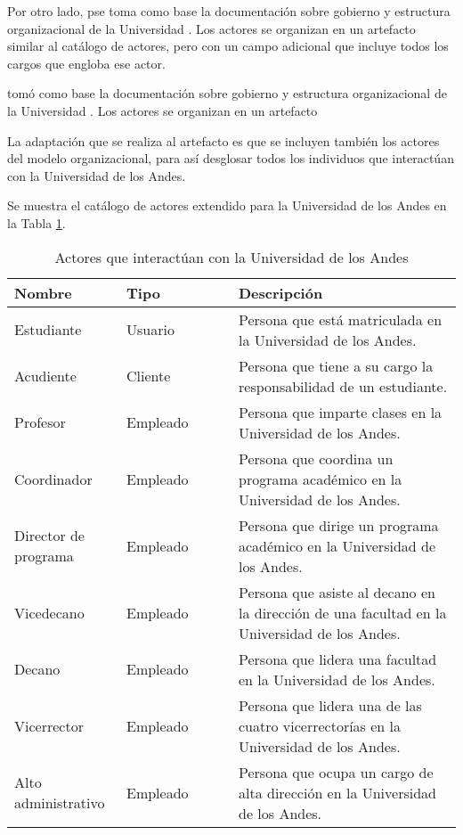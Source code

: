 Por otro lado, pse toma como base la documentación sobre gobierno y estructura organizacional de la Universidad \cite{gobieronEstructuraOrganizacional}. Los actores se organizan en un artefacto similar al catálogo de actores, pero con un campo adicional que incluye todos los cargos que engloba ese actor.


tomó como base la documentación sobre gobierno y estructura organizacional de la Universidad \cite{gobiernoEstructuraOrganizacional}. Los actores se organizan en un artefacto


La adaptación que se realiza al artefacto es que se incluyen también los actores del modelo organizacional, para así desglosar todos los individuos que interactúan con la Universidad de los Andes.

Se muestra el catálogo de actores extendido para la Universidad de los Andes en la Tabla \ref{tab:actores}.

\begin{table}[h]
	\caption{Actores que interactúan con la Universidad de los Andes}
	\centering
	\alternatecolors
	\begin{tabular}{|p{0.25\linewidth}|p{0.25\linewidth}|p{0.5\linewidth}|}
		\hline
		\textbf{Nombre}      & \textbf{Tipo} & \textbf{Descripción}                                                                         \\
		\hline
		Estudiante           & Usuario       & Persona que está matriculada en la Universidad de los Andes.                                 \\
		Acudiente            & Cliente       & Persona que tiene a su cargo la responsabilidad de un estudiante.                            \\ \hline
		Profesor             & Empleado      & Persona que imparte clases en la Universidad de los Andes.                                   \\ \hline
		Coordinador          & Empleado      & Persona que coordina un programa académico en la Universidad de los Andes.                   \\ \hline
		Director de programa & Empleado      & Persona que dirige un programa académico en la Universidad de los Andes.                     \\
		Vicedecano           & Empleado      & Persona que asiste al decano en la dirección de una facultad en la Universidad de los Andes. \\
		Decano               & Empleado      & Persona que lidera una facultad en la Universidad de los Andes.                              \\
		Vicerrector          & Empleado      & Persona que lidera una de las cuatro vicerrectorías en la Universidad de los Andes.          \\
		Alto administrativo  & Empleado      & Persona que ocupa un cargo de alta dirección en la Universidad de los Andes.                 \\
		\hline
	\end{tabular}
	\label{tab:actores}
\end{table}


